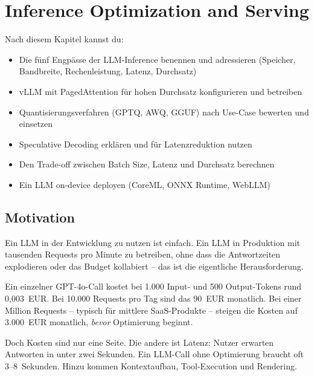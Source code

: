 \chapter{Inference Optimization and Serving}
\label{chap:inference}

\begin{lernziele}
Nach diesem Kapitel kannst du:
\begin{itemize}
    \item Die fünf Engpässe der LLM-Inference benennen und adressieren (Speicher, Bandbreite, Rechenleistung, Latenz, Durchsatz)
    \item vLLM mit PagedAttention für hohen Durchsatz konfigurieren und betreiben
    \item Quantisierungsverfahren (GPTQ, AWQ, GGUF) nach Use-Case bewerten und einsetzen
    \item Speculative Decoding erklären und für Latenzreduktion nutzen
    \item Den Trade-off zwischen Batch Size, Latenz und Durchsatz berechnen
    \item Ein LLM on-device deployen (CoreML, ONNX Runtime, WebLLM)
\end{itemize}
\end{lernziele}

\section{Motivation}

Ein LLM in der Entwicklung zu nutzen ist einfach. Ein LLM in Produktion mit tausenden Requests pro Minute zu betreiben, ohne dass die Antwortzeiten explodieren oder das Budget kollabiert -- das ist die eigentliche Herausforderung.

Ein einzelner GPT-4o-Call kostet bei 1.000 Input- und 500 Output-Tokens rund 0,003~EUR. Bei 10.000 Requests pro Tag sind das 90~EUR monatlich. Bei einer Million Requests -- typisch für mittlere SaaS-Produkte -- steigen die Kosten auf 3.000~EUR monatlich, \textit{bevor} Optimierung beginnt.

Doch Kosten sind nur eine Seite. Die andere ist Latenz: Nutzer erwarten Antworten in unter zwei Sekunden. Ein LLM-Call ohne Optimierung braucht oft 3--8~Sekunden. Hinzu kommen Kontextaufbau, Tool-Execution und Rendering.


